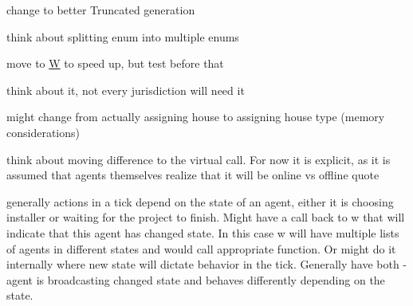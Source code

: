 
\begin{DoxyRefList}
\item[\label{_dev_stage2__DevStage2000027}%
\hypertarget{_dev_stage2__DevStage2000027}{}%
Member \hyperlink{namespaceserialize_aa5ee0bad0c960a3f06430066217d8c12}{serialize\+:\+:solve\+\_\+str\+\_\+formula} (const std\+::string \&formula\+\_\+, I\+Random \&rand\+\_\+)]change to better Truncated generation  
\item[\label{_dev_stage2__DevStage2000026}%
\hypertarget{_dev_stage2__DevStage2000026}{}%
Member \hyperlink{namespacesolar__core_aa1147341e5ef7a40d68d1bd68e149362}{solar\+\_\+core\+:\+:E\+Param\+Types} ]think about splitting enum into multiple enums 
\item[\label{_dev_stage2__DevStage2000001}%
\hypertarget{_dev_stage2__DevStage2000001}{}%
Member \hyperlink{classsolar__core_1_1_g_a624adac31ade604e0335717bad4fc9cd}{solar\+\_\+core\+:\+:G\+:\+:G} (const Property\+Tree \&pt\+\_\+, \hyperlink{classsolar__core_1_1_w}{W} $\ast$w\+\_\+)]move to \hyperlink{classsolar__core_1_1_w}{W} to speed up, but test before that  
\item[\label{_dev_stage2__DevStage2000002}%
\hypertarget{_dev_stage2__DevStage2000002}{}%
Member \hyperlink{classsolar__core_1_1_g_a33472d3b331a303ec8a9b61e2da163d3}{solar\+\_\+core\+:\+:G\+:\+:schedule\+\_\+visits} ]think about it, not every jurisdiction will need it  
\item[\label{_dev_stage2__DevStage2000008}%
\hypertarget{_dev_stage2__DevStage2000008}{}%
Class \hyperlink{classsolar__core_1_1_household}{solar\+\_\+core\+:\+:Household} ]might change from actually assigning house to assigning house type (memory considerations) 
\item[\label{_dev_stage2__DevStage2000005}%
\hypertarget{_dev_stage2__DevStage2000005}{}%
Member \hyperlink{classsolar__core_1_1_household_a165b7c64c72e5ed4ea08307e32082517}{solar\+\_\+core\+:\+:Household\+:\+:ac\+\_\+inf\+\_\+quoting\+\_\+sei} ()]think about moving difference to the virtual call. For now it is explicit, as it is assumed that agents themselves realize that it will be online vs offline quote  
\item[\label{_dev_stage2__DevStage2000007}%
\hypertarget{_dev_stage2__DevStage2000007}{}%
Member \hyperlink{classsolar__core_1_1_household_a1e7d20a60dc42b8d09a8d23a4cdb26a6}{solar\+\_\+core\+:\+:Household\+:\+:act\+\_\+tick} ()]generally actions in a tick depend on the state of an agent, either it is choosing installer or waiting for the project to finish. Might have a call back to w that will indicate that this agent has changed state. In this case w will have multiple lists of agents in different states and would call appropriate function. Or might do it internally where new state will dictate behavior in the tick. Generally have both -\/ agent is broadcasting changed state and behaves differently depending on the state.  

\end{DoxyRefList}
